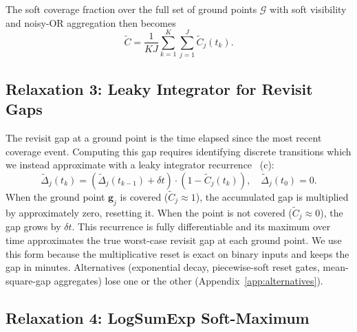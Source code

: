 The soft coverage fraction over the full set of ground points $\mathcal{G}$ with soft visibility and noisy-OR aggregation then becomes
\begin{equation}
    \tilde{C} = \frac{1}{KJ} \sum_{k=1}^{K} \sum_{j=1}^{J} \tilde{C}_j(t_k).
    \label{eq:coverage_fraction}
\end{equation}

\subsection{Relaxation 3: Leaky Integrator for Revisit Gaps}
\label{sec:leaky_integrator}

The revisit gap at a ground point is the time elapsed since the most recent coverage event. Computing this gap requires identifying discrete transitions which we instead approximate with a leaky integrator recurrence~\citep{gerstner_spiking_2002} (c):
\begin{equation}
    \tilde{\Delta}_j(t_k) = \left(\tilde{\Delta}_j(t_{k-1}) + \delta t\right) \cdot \left(1 - \tilde{C}_j(t_k)\right), \quad \tilde{\Delta}_j(t_0) = 0.
    \label{eq:leaky_integrator}
\end{equation}
When the ground point $\mathbf{g}_j$ is covered ($\tilde{C}_j \approx 1$), the accumulated gap is multiplied by approximately zero, resetting it.
When the point is not covered ($\tilde{C}_j \approx 0$), the gap grows by $\delta t$.
This recurrence is fully differentiable and its maximum over time approximates the true worst-case revisit gap at each ground point.
We use this form because the multiplicative reset is exact on binary inputs and keeps the gap in minutes. Alternatives (exponential decay, piecewise-soft reset gates, mean-square-gap aggregates) lose one or the other (Appendix~\ref{app:alternatives}).

\subsection{Relaxation 4: LogSumExp Soft-Maximum}
\label{sec:logsumexp}

